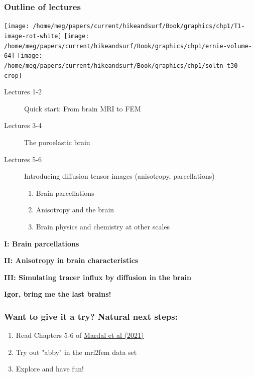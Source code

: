 \documentclass[10pt, mathserif, aspectratio=169, t]{beamer}
\newcommand{\mysection}[1]{\begin{frame} \begin{center} \vspace{3em} \textbf{#1} \end{center} \end{frame}}
\begin{document}
\begin{frame}
  \frametitle{Outline of lectures}
  \begin{center}
  \texttt{[image: /home/meg/papers/current/hikeandsurf/Book/graphics/chp1/T1-image-rot-white]}
  \texttt{[image: /home/meg/papers/current/hikeandsurf/Book/graphics/chp1/ernie-volume-64]}
  \texttt{[image: /home/meg/papers/current/hikeandsurf/Book/graphics/chp1/soltn-t30-crop]}
  \end{center}
  \begin{description}
    \item[Lectures 1-2] Quick start: From brain MRI to FEM
    \item[Lectures 3-4] The poroelastic brain  
    \item[Lectures 5-6] Introducing diffusion tensor images (anisotropy, parcellations)
      \begin{enumerate}[I]
      \item
        Brain parcellations 
      \item
        Anisotropy and the brain
      \item
        Brain physics and chemistry at other scales
      \end{enumerate}
  \end{description}
\end{frame}

\graphicspath{{/home/meg/presentations/slidesx/}}

\mysection{I: Brain parcellations}



\mysection{II: Anisotropy in brain characteristics}



\mysection{III: Simulating tracer influx by diffusion in the brain}



\mysection{Igor, bring me the last brains!}
 
\begin{frame}
\frametitle{Want to give it a try? Natural next steps:}
\begin{enumerate}
\item
  Read Chapters 5-6 of \href{https://github.com/kent-and/mri2fem}{Mardal et al (2021)}
\item
  Try out "abby" in the mri2fem data set        
\item
  Explore and have fun!                
\end{enumerate}
\end{frame}
\end{document}
